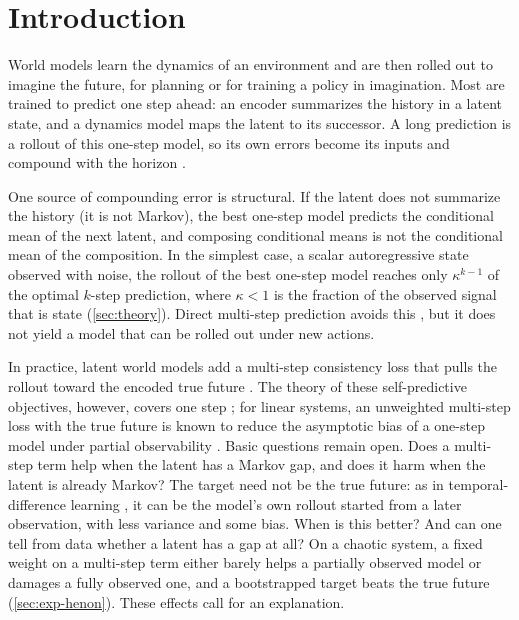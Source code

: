 \section{Introduction}
\label{sec:intro}

World models learn the dynamics of an environment and are then rolled out to imagine the future, for planning or for training a policy in imagination. Most are trained to predict one step ahead: an encoder summarizes the history in a latent state, and a dynamics model maps the latent to its successor. A long prediction is a rollout of this one-step model, so its own errors become its inputs and compound with the horizon \citep{talvitie2014model, venkatraman2015improving}.

One source of compounding error is structural. If the latent does not summarize the history (it is not Markov), the best one-step model predicts the conditional mean of the next latent, and composing conditional means is not the conditional mean of the composition. In the simplest case, a scalar autoregressive state observed with noise, the rollout of the best one-step model reaches only $\kappa^{k-1}$ of the optimal $k$-step prediction, where $\kappa < 1$ is the fraction of the observed signal that is state (\cref{sec:theory}). Direct multi-step prediction avoids this \citep{lambert2021learning, somalwar2025imperfect, somalwar2026statistical}, but it does not yield a model that can be rolled out under new actions.

In practice, latent world models add a multi-step consistency loss that pulls the rollout toward the encoded true future \citep{hafner2019planet, schwarzer2021spr, hansen2022tdmpc}. The theory of these self-predictive objectives, however, covers one step \citep{tang2023selfpredictive, ni2024bridging}; for linear systems, an unweighted multi-step loss with the true future is known to reduce the asymptotic bias of a one-step model under partial observability \citep{somalwar2026statistical}. Basic questions remain open. Does a multi-step term help when the latent has a Markov gap, and does it harm when the latent is already Markov? The target need not be the true future: as in temporal-difference learning \citep{sutton2004tdnetworks}, it can be the model's own rollout started from a later observation, with less variance and some bias. When is this better? And can one tell from data whether a latent has a gap at all? On a chaotic system, a fixed weight on a multi-step term either barely helps a partially observed model or damages a fully observed one, and a bootstrapped target beats the true future (\cref{sec:exp-henon}). These effects call for an explanation.

